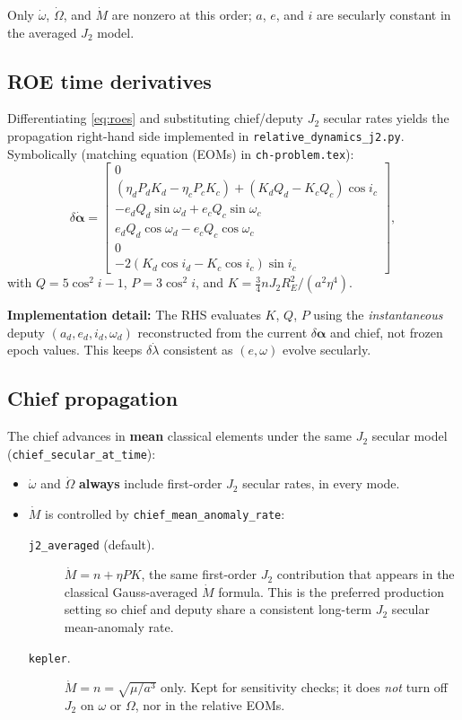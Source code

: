 \documentclass[11pt]{article}
\begin{document}
Only $\dot\omega$, $\dot\Omega$, and $\dot M$ are nonzero at this order; $a$, $e$, and $i$ are secularly constant in the averaged $J_2$ model.

\subsection{ROE time derivatives}

Differentiating \eqref{eq:roes} and substituting chief/deputy $J_2$ secular rates yields the propagation right-hand side implemented in \texttt{relative\_dynamics\_j2.py}. Symbolically (matching equation (EOMs) in \texttt{ch-problem.tex}):
\begin{equation}
\delta\dot{\bm{\alpha}} =
\begin{bmatrix}
0 \\
(\eta_d P_d K_d - \eta_c P_c K_c) + (K_d Q_d - K_c Q_c)\cos i_c \\
-e_d Q_d \sin\omega_d + e_c Q_c \sin\omega_c \\
e_d Q_d \cos\omega_d - e_c Q_c \cos\omega_c \\
0 \\
-2(K_d\cos i_d - K_c\cos i_c)\sin i_c
\end{bmatrix},
\end{equation}
with $Q = 5\cos^2 i - 1$, $P = 3\cos^2 i$, and $K = \tfrac{3}{4} n J_2 R_E^2 / (a^2 \eta^4)$.

\textbf{Implementation detail:} The RHS evaluates $K$, $Q$, $P$ using the \emph{instantaneous} deputy $(a_d,e_d,i_d,\omega_d)$ reconstructed from the current $\delta\bm{\alpha}$ and chief, not frozen epoch values. This keeps $\delta\dot\lambda$ consistent as $(e,\omega)$ evolve secularly.

\subsection{Chief propagation}

The chief advances in \textbf{mean} classical elements under the same $J_2$ secular model (\texttt{chief\_secular\_at\_time}):
\begin{itemize}
    \item $\dot\omega$ and $\dot\Omega$ \textbf{always} include first-order $J_2$ secular rates, in every mode.
    \item $\dot M$ is controlled by \texttt{chief\_mean\_anomaly\_rate}:
    \begin{description}
        \item[\texttt{j2\_averaged} (default).] $\dot M = n + \eta P K$, the same first-order $J_2$ contribution that appears in the classical Gauss-averaged $\dot M$ formula. This is the preferred production setting so chief and deputy share a consistent long-term $J_2$ secular mean-anomaly rate.
        \item[\texttt{kepler}.] $\dot M = n = \sqrt{\mu/a^3}$ only. Kept for sensitivity checks; it does \emph{not} turn off $J_2$ on $\omega$ or $\Omega$, nor in the relative EOMs.
    \end{description}
\end{itemize}
\end{document}
